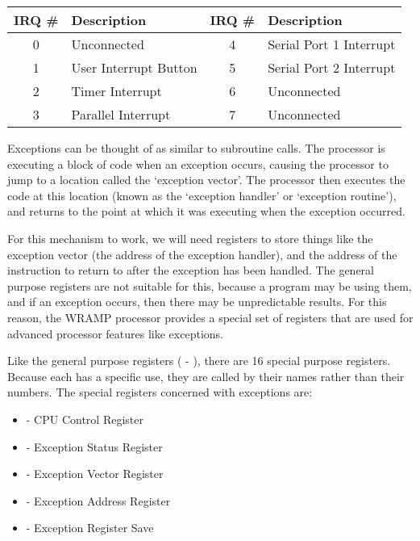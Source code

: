 \begin{center}
\begin{tabular}{|c|l|c|l|}
\hline
\textbf{IRQ \#} & \textbf{Description} & \textbf{IRQ \#} &
\textbf{Description} \\
\hline
0 & Unconnected & 4 & Serial Port 1 Interrupt \\
\hline
1 & User Interrupt Button & 5 & Serial Port 2 Interrupt\\
\hline
2 & Timer Interrupt & 6 & Unconnected \\
\hline
3 & Parallel Interrupt &7 & Unconnected \\
\hline
\end{tabular}
\end{center}

Exceptions can be thought of as similar to subroutine calls. The
processor is executing a block of code when an exception occurs,
causing the processor to jump to a location called the `exception
vector'. The processor then executes the code at this location (known
as the `exception handler' or `exception routine'), and returns to the
point at which it was executing when the exception occurred.

For this mechanism to work, we will need registers to store things
like the exception vector (the address of the exception handler), and
the address of the instruction to return to after the exception has
been handled. The general purpose registers are not suitable for this,
because a program may be using them, and if an exception occurs, then
there may be unpredictable results. For this reason, the WRAMP
processor provides a special set of registers that are used for
advanced processor features like exceptions.

Like the general purpose registers ( - ), there are 16 special
purpose registers. Because each has a specific use, they are called by
their names rather than their numbers. The special registers concerned
with exceptions are:

\begin{itemize}
\item {} - CPU Control Register
\item {} - Exception Status Register
\item {} - Exception Vector Register
\item {} - Exception Address Register
\item {} - Exception Register Save
\end{itemize}

